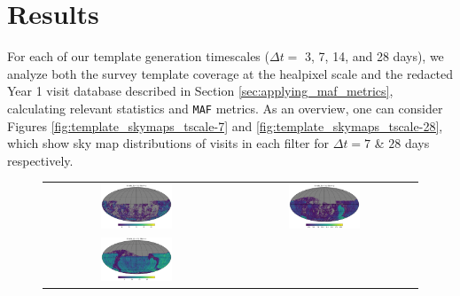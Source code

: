 \documentclass[preprintm,linenumbers]{aastex631}
\newcommand{\maf}{\texttt{MAF}\xspace}
\begin{document}
		
		\section{Results}
		\label{sec:results}
		
		For each of our template generation timescales ($\Delta t =$ 3, 7, 14, and 28 days), we analyze both the survey template coverage at the healpixel scale and the redacted Year 1 visit database described in Section \ref{sec:applying_maf_metrics}, calculating relevant statistics and \maf metrics. 
  As an overview, one can consider Figures \ref{fig:template_skymaps_tscale-7} and  \ref{fig:template_skymaps_tscale-28}, which show sky map distributions of visits in each filter for $\Delta t = 7$ \& $28$ days respectively.


		
  		\begin{figure}
			\centering
			\begin{tabular}{c c}
				\includegraphics[width=0.4\textwidth]{results/skymaps/skymap_first_year_one_snap_v4_0_10yrs_db_noDD_noTwi_tscale-7_nside-256_doAllTemplateMetrics_reduceCount_u_noDD_noTwi.pdf} &
				\includegraphics[width=0.4\textwidth]{results/skymaps/skymap_first_year_one_snap_v4_0_10yrs_db_noDD_noTwi_tscale-7_nside-256_doAllTemplateMetrics_reduceCount_g_noDD_noTwi.pdf} \\
				\includegraphics[width=0.4\textwidth]{results/skymaps/skymap_first_year_one_snap_v4_0_10yrs_db_noDD_noTwi_tscale-7_nside-256_doAllTemplateMetrics_reduceCount_r_noDD_noTwi.pdf} &

\end{tabular}
\end{figure}
\end{document}
